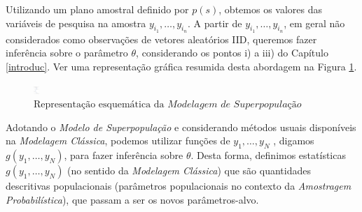 \documentclass[
  12pt,
  brazilian,
]{book}
\theoremstyle{definition}
\theoremstyle{definition}
\theoremstyle{definition}
\theoremstyle{definition}
\theoremstyle{remark}
\begin{document}
Utilizando um plano amostral definido por \(p(s)\), obtemos os valores das
variáveis de pesquisa na amostra \(y_{i_1}, \ldots , y_{i_n}\). A partir de
\(y_{i_1}, \ldots , y_{i_n}\), em geral não considerados como observações de
vetores aleatórios IID, queremos fazer inferência sobre o parâmetro \(\theta\),
considerando os pontos i) a iii) do Capítulo \ref{introduc}. Ver uma representação gráfica
resumida desta abordagem na Figura \ref{fig:modsup}.

\begin{figure}

{\centering \includegraphics[width=8,79in]{Figuras/Figura2.3} 

}

\caption{$\text{Representação esquemática da }\textit{Modelagem de Superpopulação}$}\label{fig:modsup}
\end{figure}

Adotando o \emph{Modelo de Superpopulação} e considerando métodos usuais disponíveis
na \emph{Modelagem Clássica}, podemos utilizar funções de \(y_{1}, \ldots ,y_{N}\) ,
digamos \(g( y_{1}, \ldots , y_{N})\), para fazer inferência sobre \(\theta\). Desta
forma, definimos estatísticas \(g\left( y_{1}, \ldots , y_{N} \right)\) (no sentido da \emph{Modelagem Clássica}) que são quantidades descritivas populacionais (parâmetros
populacionais no contexto da \emph{Amostragem Probabilística}), que passam a ser os
novos parâmetros-alvo.
\end{document}
